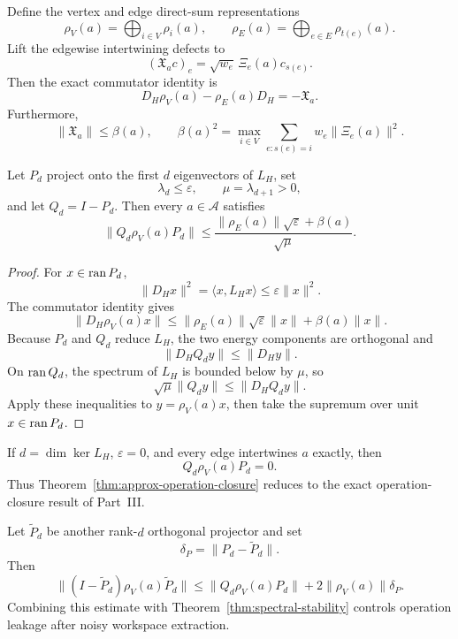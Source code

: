 
Define the vertex and edge direct-sum representations
\[
\rho_V(a)=\bigoplus_{i\in V}\rho_i(a),
\qquad
\rho_E(a)=\bigoplus_{e\in E}\rho_{t(e)}(a).
\]
Lift the edgewise intertwining defects to
\[
(\mathfrak X_a c)_e
=
\sqrt{w_e}\,\Xi_e(a)c_{s(e)}.
\]
Then the exact commutator identity is
\[
\boxed{
D_H\rho_V(a)-\rho_E(a)D_H=-\mathfrak X_a.
}
\]
Furthermore,
\[
\|\mathfrak X_a\|
\leq
\beta(a),
\qquad
\beta(a)^2
=
\max_{i\in V}
\sum_{e:s(e)=i}w_e\|\Xi_e(a)\|^2.
\]

\begin{theorem}\label{thm:approx-operation-closure}
Let \(P_d\) project onto the first \(d\) eigenvectors of \(L_H\), set
\[
\lambda_d\leq\varepsilon,
\qquad
\mu=\lambda_{d+1}>0,
\]
and let \(Q_d=I-P_d\). Then every \(a\in\mathcal A\) satisfies
\[
\boxed{
\|Q_d\rho_V(a)P_d\|
\leq
\frac{
\|\rho_E(a)\|\sqrt{\varepsilon}+\beta(a)
}{\sqrt{\mu}}.
}
\]
\end{theorem}

\begin{proof}
For \(x\in\operatorname{ran} P_d\),
\[
\|D_Hx\|^2
=\langle x,L_Hx\rangle
\leq\varepsilon\|x\|^2.
\]
The commutator identity gives
\[
\|D_H\rho_V(a)x\|
\leq
\|\rho_E(a)\|\sqrt{\varepsilon}\|x\|
+
\beta(a)\|x\|.
\]
Because \(P_d\) and \(Q_d\) reduce \(L_H\), the two energy components are
orthogonal and
\[
\|D_HQ_dy\|\leq\|D_Hy\|.
\]
On \(\operatorname{ran} Q_d\), the spectrum of \(L_H\) is bounded below by \(\mu\), so
\[
\sqrt{\mu}\|Q_dy\|
\leq
\|D_HQ_dy\|.
\]
Apply these inequalities to \(y=\rho_V(a)x\), then take the supremum over unit
\(x\in\operatorname{ran} P_d\).
\end{proof}

\begin{corollary}
If \(d=\dim\ker L_H\), \(\varepsilon=0\), and every edge intertwines \(a\)
exactly, then
\[
Q_d\rho_V(a)P_d=0.
\]
Thus Theorem~\ref{thm:approx-operation-closure} reduces to the exact
operation-closure result of Part~III.
\end{corollary}

\begin{corollary}\label{cor:closure-drift}
Let \(\widetilde P_d\) be another rank-\(d\) orthogonal projector and set
\[
\delta_P=\|P_d-\widetilde P_d\|.
\]
Then
\[
\boxed{
\|(I-\widetilde P_d)\rho_V(a)\widetilde P_d\|
\leq
\|Q_d\rho_V(a)P_d\|
+2\|\rho_V(a)\|\delta_P.
}
\]
Combining this estimate with Theorem~\ref{thm:spectral-stability} controls
operation leakage after noisy workspace extraction.
\end{corollary}

